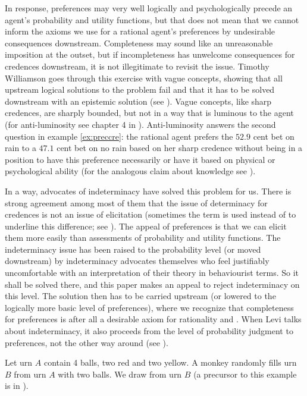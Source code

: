 \documentclass[12pt]{article}
\begin{document}
In response, preferences may very well logically and psychologically
precede an agent's probability and utility functions, but that does
not mean that we cannot inform the axioms we use for a rational
agent's preferences by undesirable consequences downstream.
Completeness may sound like an unreasonable imposition at the outset,
but if incompleteness has unwelcome consequences for credences
downstream, it is not illegitimate to revisit the issue. Timothy
Williamson goes through this exercise with vague concepts, showing
that all upstream logical solutions to the problem fail and that it
has to be solved downstream with an epistemic solution (see
). Vague concepts, like sharp credences, are
sharply bounded, but not in a way that is luminous to the agent (for
anti-luminosity see chapter 4 in ).
Anti-luminosity answers the second question in example
\ref{ex:preccre}: the rational agent prefers the $52.9$ cent bet on
rain to a $47.1$ cent bet on no rain based on her sharp credence
without being in a position to have this preference necessarily or
have it based on physical or psychological ability (for the analogous
claim about knowledge see ).

In a way, advocates of indeterminacy have solved this problem for us.
There is strong agreement among most of them that the issue of
determinacy for credences is not an issue of elicitation (sometimes
the term  is used instead of 
to underline this difference; see ). The appeal
of preferences is that we can elicit them more easily than assessments
of probability and utility functions. The indeterminacy issue has been
raised to the probability level (or moved downstream) by indeterminacy
advocates themselves who feel justifiably uncomfortable with an
interpretation of their theory in behaviourist terms. So it shall be
solved there, and this paper makes an appeal to reject indeterminacy
on this level. The solution then has to be carried upstream (or
lowered to the logically more basic level of preferences), where we
recognize that completeness for preferences is after all a desirable
axiom for rationality and  . When Levi talks
about indeterminacy, it also proceeds from the level of probability
judgment to preferences, not the other way around (see
).

\begin{quotex}
  \label{ex:monkey} Let urn $A$ contain 4
  balls, two red and two yellow. A monkey randomly fills urn $B$ from
  urn $A$ with two balls. We draw from urn $B$ (a precursor to this
  example is in ).
\end{quotex}
\end{document}
